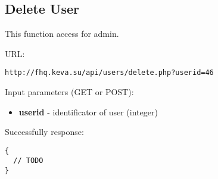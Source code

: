 \subsection{Delete User}
\par

This function access for admin.

URL:
\begin{Verbatim}[frame=single]
http://fhq.keva.su/api/users/delete.php?userid=46
\end{Verbatim}

Input parameters (GET or POST):
\begin{itemize}
  \item \textbf{userid} - identificator of user (integer)
\end{itemize}

Successfully response:  \\
\begin{Verbatim}[frame=single]
{
  // TODO
}
\end{Verbatim}

~
